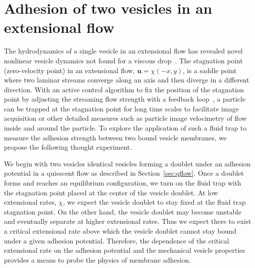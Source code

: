 \documentclass[prf,superscriptaddress,showpacs]{revtex4-1}
\newcommand{\uu}{\mathbf{u}}
\begin{document}
\section{Adhesion of two vesicles in an extensional flow} 
\label{sec:eflow} 
The hydrodynamics of a single vesicle in an extensional flow has
revealed novel nonlinear vesicle dynamics not found for a viscous
drop~\cite{KantslerSegreSteinberg2008_PRL, ZhaoShaqfeh2013_JFM,
Narsimhan2014_JFM, DahlNarsimhanGouveia2016_SoftMatt}.  The stagnation
point (zero-velocity point) in an extensional flow, $\uu =\chi(-x,y)$,
is a saddle point where two laminar streams converge along an axis and
then diverge in a different direction.  With an active control algorithm
to fix the position of the stagnation point by adjusting the streaming
flow strength with a feedback loop~\cite{Johnson-Chavarria2011_EMJ}, a
particle can be trapped at the stagnation point for long time scales to
facilitate image acquisition or other detailed measures such as particle
image velocimetry of flow inside and around the particle.  To explore
the application of such a fluid trap to measure the adhesion strength
between two bound vesicle membranes, we propose the following thought
experiment.

We begin with two vesicles identical vesicles forming a doublet under an
adhesion potential in a quiescent flow as described in
Section~\ref{sec:qflow}.  Once a doublet forms and reaches an
equilibrium configuration, we turn on the fluid trap with the stagnation
point placed at the center of the vesicle doublet.  At low extensional
rates, $\chi$, we expect the vesicle doublet to stay fixed at the fluid
trap stagnation point.  On the other hand, the vesicle doublet may
become unstable and eventually separate at higher extensional rates.
Thus we expect there to exist a critical extensional rate above which
the vesicle doublet cannot stay bound under a given adhesion potential.
Therefore, the dependence of the critical extensional rate on the
adhesion potential and the mechanical vesicle properties provides a
means to probe the physics of membrane adhesion.
\end{document}

